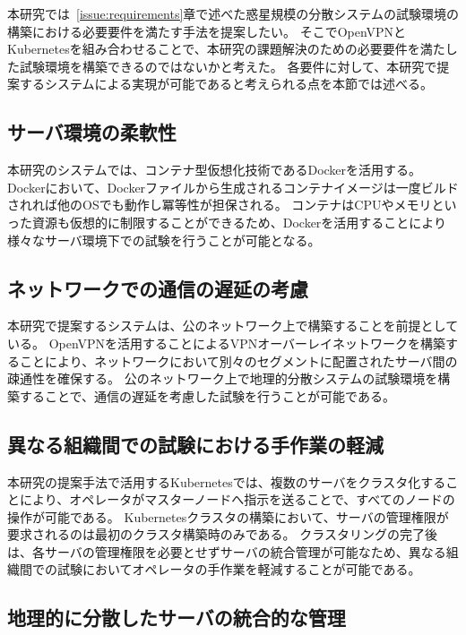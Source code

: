 本研究では~\ref{issue:requirements}章で述べた惑星規模の分散システムの試験環境の構築における必要要件を満たす手法を提案したい。
そこでOpenVPNとKubernetesを組み合わせることで、本研究の課題解決のための必要要件を満たした試験環境を構築できるのではないかと考えた。
各要件に対して、本研究で提案するシステムによる実現が可能であると考えられる点を本節では述べる。

\subsection{サーバ環境の柔軟性}
\label{issue:requirements1}

本研究のシステムでは、コンテナ型仮想化技術であるDockerを活用する。
Dockerにおいて、Dockerファイルから生成されるコンテナイメージは一度ビルドされれば他のOSでも動作し冪等性が担保される。
コンテナはCPUやメモリといった資源も仮想的に制限することができるため、Dockerを活用することにより様々なサーバ環境下での試験を行うことが可能となる。

\subsection{ネットワークでの通信の遅延の考慮}
\label{issue:requirements2}

本研究で提案するシステムは、公のネットワーク上で構築することを前提としている。
OpenVPNを活用することによるVPNオーバーレイネットワークを構築することにより、ネットワークにおいて別々のセグメントに配置されたサーバ間の疎通性を確保する。
公のネットワーク上で地理的分散システムの試験環境を構築することで、通信の遅延を考慮した試験を行うことが可能である。

\subsection{異なる組織間での試験における手作業の軽減}
\label{issue:requirements3}

本研究の提案手法で活用するKubernetesでは、複数のサーバをクラスタ化することにより、オペレータがマスターノードへ指示を送ることで、すべてのノードの操作が可能である。
Kubernetesクラスタの構築において、サーバの管理権限が要求されるのは最初のクラスタ構築時のみである。
クラスタリングの完了後は、各サーバの管理権限を必要とせずサーバの統合管理が可能なため、異なる組織間での試験においてオペレータの手作業を軽減することが可能である。

\subsection{地理的に分散したサーバの統合的な管理}
\label{issue:requirements4}

